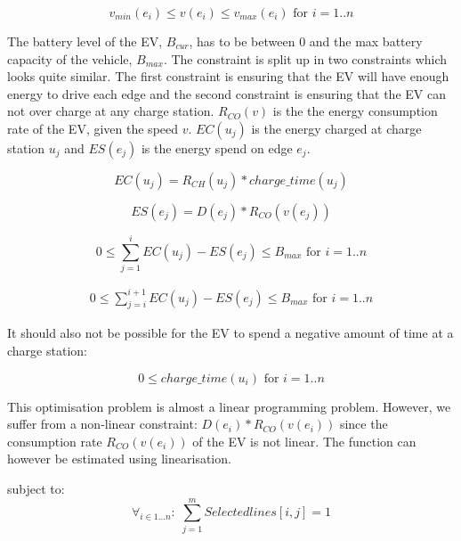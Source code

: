 \begin{equation}
v_{min}(e_i) \leq v(e_i) \leq v_{max}(e_i) \text{ for } i = 1..n  
\end{equation}

The battery level of the EV, $B_{cur}$, has to be between $0$ and the max battery capacity of the vehicle, $B_{max}$. The constraint is split up in two constraints which looks quite similar. The first constraint is ensuring that the EV will have enough energy to drive each edge and the second constraint is ensuring that the EV can not over charge at any charge station. $R_{CO}(v)$ is the the energy consumption rate of the EV, given the speed $v$. $EC(u_j)$ is the energy charged at charge station $u_j$ and $ES(e_j)$ is the
energy spend on edge $e_j$.  

\begin{equation}
EC(u_j) = R_{CH}(u_j) * charge\_time(u_j)
\end{equation}

\begin{equation}
ES(e_j) = D(e_j)*R_{CO}(v(e_j))
\end{equation} 

\begin{equation}
0 \leq \sum_{j=1}^{i} EC(u_j) - ES(e_j) \leq B_{max} \text{ for } i = 1..n
\end{equation}

\begin{equation}
\begin{aligned}
0 \leq \sum_{j=i}^{i+1} EC(u_j) - ES(e_j) \leq B_{max} \text{ for } i = 1..n
\end{aligned}
\end{equation}

It should also not be possible for the EV to spend a negative amount of time at a charge station:

\begin{equation}
0 \leq charge\_time(u_i) \text{ for } i = 1..n 
\end{equation}

This optimisation problem is almost a linear programming problem. However, we suffer from a non-linear constraint: $D(e_i)*R_{CO}(v(e_i))$ since the consumption rate $R_{CO}(v(e_i))$ of the EV is not linear. The function can however be estimated using linearisation. 

subject to: 
\begin{equation}
\forall_{i\in1 \dots n }:\; \sum_{j=1}^{m} Selectedlines[i,j] = 1
\end{equation}

